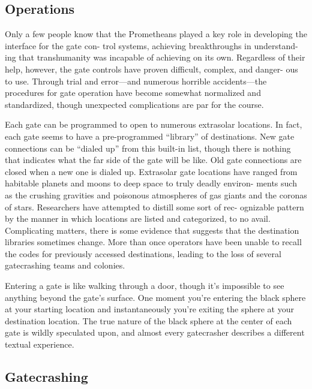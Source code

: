 \subsection{Operations}

Only a few people know that the Prometheans played 
a key role in developing the interface for the gate con-
trol systems, achieving breakthroughs in understand-
ing that transhumanity was incapable of achieving on 
its own. Regardless of their help, however, the gate 
controls have proven difficult, complex, and danger-
ous to use. Through trial and error—and numerous 
horrible accidents—the procedures for gate operation 
have become somewhat normalized and standardized, 
though unexpected complications are par for the 
course.

Each gate can be programmed to open to numerous 
extrasolar locations. In fact, each gate seems to have 
a pre-programmed ``library'' of destinations. New 
gate connections can be ``dialed up'' from this built-in 
list, though there is nothing that indicates what the 
far side of the gate will be like. Old gate connections 
are closed when a new one is dialed up. Extrasolar 
gate locations have ranged from habitable planets 
and moons to deep space to truly deadly environ-
ments such as the crushing gravities and poisonous 
atmospheres of gas giants and the coronas of stars. 
Researchers have attempted to distill some sort of rec-
ognizable pattern by the manner in which locations 
are listed and categorized, to no avail. Complicating 
matters, there is some evidence that suggests that the 
destination libraries sometimes change. More than 
once operators have been unable to recall the codes 
for previously accessed destinations, leading to the 
loss of several gatecrashing teams and colonies.

Entering a gate is like walking through a door, 
though it's impossible to see anything beyond the 
gate's surface. One moment you're entering the black 
sphere at your starting location and instantaneously 
you're exiting the sphere at your destination location. 
The true nature of the black sphere at the center of 
each gate is wildly speculated upon, and almost every 
gatecrasher describes a different textual experience. 

\subsection{Gatecrashing}

